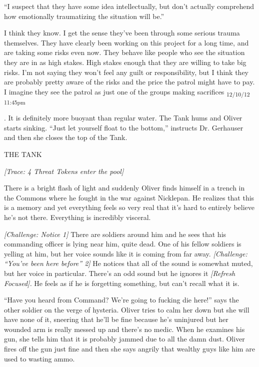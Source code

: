 {``I suspect that they have some idea intellectually, but don't actually comprehend how emotionally traumatizing the situation will be.''

I think they know.  I get the sense they've been through some serious trauma themselves.  They have clearly been working on this project for a long time, and are taking some risks even now.  They behave like people who see the situation they are in as high stakes.  High stakes enough that they are willing to take big risks.  I'm not saying they won't feel any guilt or responsibility, but I think they are probably pretty aware of the risks and the price the patrol might have to pay.  I imagine they see the patrol as just one of the groups making sacrifices \textsubscript{12/10/12 11:45pm}}.  It is definitely more buoyant than regular water.  The Tank hums and Oliver starts sinking.  ``Just let yourself float to the bottom,'' instructs Dr. Gerhauser and then she closes the top of the Tank.



 {\LARGE THE TANK } 

\textit{{[}Trace: 4 Threat Tokens enter the pool{]}}



There is a bright flash of light and suddenly Oliver finds himself in a trench in the Commons where he fought in the war against Nicklepan.  He realizes that this is a memory and yet everything feels so very real that it's hard to entirely believe he's not there.  Everything is incredibly visceral.



\textit{{[}Challenge: Notice 1{]}} There are soldiers around him and he sees that his commanding officer is lying near him, quite dead.  One of his fellow soldiers is yelling at him, but her voice sounds like it is coming from far away.  \textit{{[}Challenge: ``You've been here before'' 2{]}} He notices that all of the sound is somewhat muted, but her voice in particular.  There's an odd sound but he ignores it \textit{{[}Refresh Focused{]}.} He feels as if he is forgetting something, but can't recall what it is.



``Have you heard from Command?  We're going to fucking die here!'' says the other soldier on the verge of hysteria.  Oliver tries to calm her down but she will have none of it, sneering that he'll be fine because he's uninjured but her wounded arm is really messed up and there's no medic.  When he examines his gun, she tells him that it is probably jammed due to all the damn dust.  Oliver fires off the gun just fine and then she says angrily that wealthy guys like him are used to wasting ammo. 



